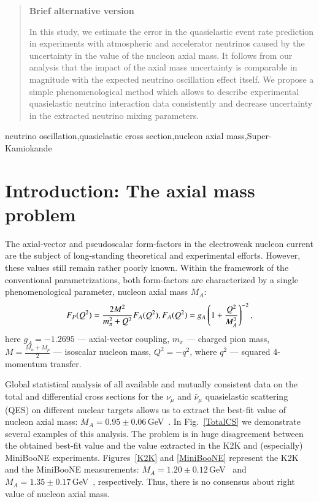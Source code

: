\documentclass[preprint]{elsarticle}
\begin{document}
\begin{frontmatter}
\begin{abstract}
\textbf{Brief alternative version}

In this study, we estimate the error in the quasielastic event rate prediction in experiments with atmospheric and accelerator neutrinos caused by the uncertainty in the value of the nucleon axial mass. It follows from our analysis that the impact of the axial mass uncertainty is comparable in magnitude with the expected neutrino oscillation effect itself. We propose a simple phenomenological method which allows to describe experimental quasielastic neutrino interaction data consistently and decrease uncertainty in the extracted neutrino mixing parameters.
\end{abstract}

\begin{keyword}
neutrino oscillation\sep quasielastic cross section\sep nucleon axial mass\sep Super-Kamiokande
\end{keyword}

\end{frontmatter}

\linenumbers

\section{Introduction: The axial mass problem}

The axial-vector and pseudoscalar form-factors in the electroweak nucleon current are the subject of long-standing theoretical and experimental efforts. However, these values still remain rather poorly known. Within the framework of the conventional parametrizations, both form-factors are characterized by a single phenomenological parameter, nucleon axial mass $M_A$:
\begin{equation}
F_{P}(Q^{2})={}\frac{2M^{2}}{m_{\pi}^{2}+Q^{2}}F_{A}(Q^{2}),\\
F_{A}(Q^{2})={}g_{A}\left(1+\frac{Q^{2}}{M_{A}^{2}}\right)^{-2},
\end{equation}
here $g_{A}=-1.2695$ --- axial-vector coupling, $m_{\pi}$ --- charged pion mass, $M=\frac{M_{n}+M_{p}}{2}$ --- isoscalar nucleon mass, $Q^{2}=-q^{2}$, where $q^{2}$ --- squared 4-momentum transfer.

Global statistical analysis of all available and mutually consistent data on the total and differential cross sections for the $\nu_{\mu}$ and $\bar\nu_{\mu}$ quasielastic scattering (QES) on different nuclear targets allows us to extract the best-fit value of nucleon axial mass: $M_A=0.95\pm0.06$\,GeV~\cite{Kuzmin:2007kr}. In Fig.~\ref{TotalCS} we demonstrate several examples of this analysis. The problem is in huge disagreement between the obtained best-fit value and the value extracted in the K2K and (especially) MiniBooNE experiments. Figures~\ref{K2K} and \ref{MiniBooNE} represent the K2K and the MiniBooNE measurements: $M_A=1.20\pm0.12$\,GeV~\cite{Gran:2006jn} and $M_{A}=1.35\pm0.17$\,GeV~\cite{AguilarArevalo:2010zc}, respectively. Thus, there is no consensus about right value of nucleon axial mass.
\end{document}
